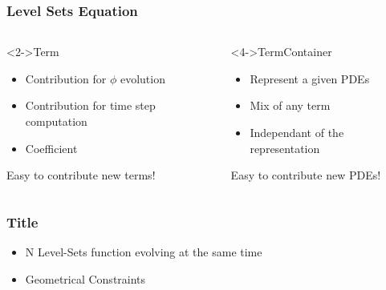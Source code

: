 \documentclass[18pt]{beamer}
\begin{document}
\begin{frame}
\frametitle{Level Sets Equation}

\begin{columns}
  \begin{block}<2->{Term}
    \begin{itemize}
      \item Contribution for $\phi$ evolution
      \item Contribution for time step computation
      \item Coefficient
    \end{itemize} 
  \alert<3->{Easy to contribute new terms!}
  \end{block}

  \begin{block}<4->{TermContainer}
    \begin{itemize}
      \item Represent a given PDEs
      \item Mix of any term
      \item Independant of the representation
    \end{itemize}
  \alert<5->{Easy to contribute new PDEs!}
  \end{block}

\end{columns}

\end{frame}

\begin{frame}
\frametitle{Title}
  \begin{itemize}
    \item N Level-Sets function evolving at the same time
    \item Geometrical Constraints
  \end{itemize}
\end{frame}


% 


% 
\end{document}
